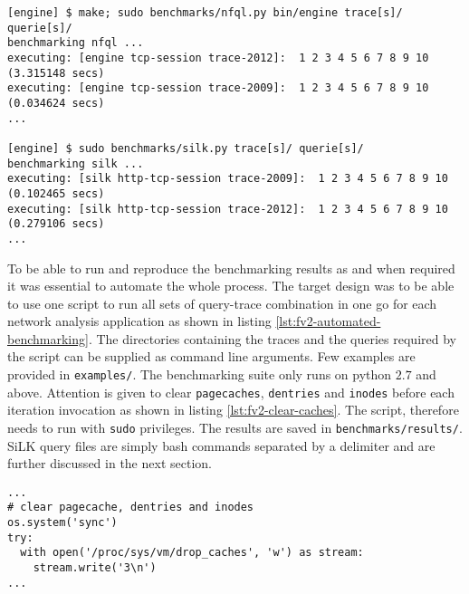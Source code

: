 \begin{lstlisting}
[engine] $ make; sudo benchmarks/nfql.py bin/engine trace[s]/ querie[s]/
benchmarking nfql ...
executing: [engine tcp-session trace-2012]:  1 2 3 4 5 6 7 8 9 10 (3.315148 secs)
executing: [engine tcp-session trace-2009]:  1 2 3 4 5 6 7 8 9 10 (0.034624 secs)
...

[engine] $ sudo benchmarks/silk.py trace[s]/ querie[s]/
benchmarking silk ...
executing: [silk http-tcp-session trace-2009]:  1 2 3 4 5 6 7 8 9 10 (0.102465 secs)
executing: [silk http-tcp-session trace-2012]:  1 2 3 4 5 6 7 8 9 10 (0.279106 secs)
...
\end{lstlisting}

To be able to run and reproduce the benchmarking results as and when required
it was essential to automate the whole process. The target design was to be
able to use one script to run all sets of query-trace combination in one go
for each network analysis application as shown in listing
\ref{lst:fv2-automated-benchmarking}. The directories containing the traces
and the queries required by the script can be supplied as command line
arguments. Few examples are provided in \texttt{examples/}. The benchmarking
suite only runs on python $2.7$ and above. Attention is given to clear
\texttt{pagecaches}, \texttt{dentries} and \texttt{inodes} before each
iteration invocation as shown in listing \ref{lst:fv2-clear-caches}. The
script, therefore needs to run with \texttt{sudo} privileges. The results are
saved in \texttt{benchmarks/results/}. SiLK query files are simply bash
commands separated by a delimiter and are further discussed in the next
section.

\begin{lstlisting}
...
# clear pagecache, dentries and inodes
os.system('sync')
try:
  with open('/proc/sys/vm/drop_caches', 'w') as stream:
    stream.write('3\n')
...
\end{lstlisting}
